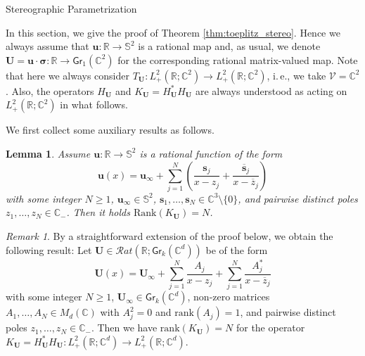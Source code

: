 \documentclass[11pt,reqno]{amsart}
\makeatletter
\newtheorem{lem}{Lemma}[section]
\theoremstyle{definition}
\theoremstyle{remark}
\theoremstyle{remark}
\newtheorem*{remark*}{Remark}
\numberwithin{equation}{section}
\newcommand{\C}{\mathbb{C}}
\newcommand{\R}{\mathbb{R}}
\newcommand{\Ss}{\mathbb{S}}
\newcommand{\VV}{\mathcal{V}}
\newcommand{\ov}{\overline}
\newcommand{\rank}{\mathrm{rank}}
\newcommand{\sv}{\mathbf{s}}
\newcommand{\uu}{\mathbf{u}}
\newcommand{\Ub}{\mathbf{U}}
\newcommand{\Gr}{\mathsf{Gr}}
\def\section{\@startsection{section}{1}%
  \z@{1.5\linespacing\@plus\linespacing}{.5\linespacing}%
  {\normalfont\bfseries\large\centering}}
\makeatother
\begin{document}
\begin{appendix}

\section{Stereographic Parametrization} \label{app:stereo}


In this section, we give the proof of Theorem \ref{thm:toeplitz_stereo}. Hence we always assume that $\uu : \R \to \Ss^2$ is a rational map and, as usual, we denote $\Ub = \uu \cdot \bm{\sigma} : \R \to \Gr_1(\C^2)$ for the corresponding rational matrix-valued map. Note that here we always consider $T_{\Ub} : L^2_+(\R; \C^2) \to L^2_+(\R; \C^2)$, i.\,e., we take $\VV = \C^2$. Also, the operators $H_\Ub$ and  $K_\Ub = H_{\Ub}^* H_\Ub$ are always understood as acting on $L^2_+(\R; \C^2)$ in what follows.


We first collect some auxiliary results as follows. 

\begin{lem} \label{lem:simple_poles}
Assume $\uu : \R \to \Ss^2$ is a rational function of the form
$$
\uu(x) = \uu_\infty + \sum_{j=1}^N \left ( \frac{\sv_j}{x-z_j} + \frac{\ov{\sv}_j}{x-\ov{z}_j} \right )
$$
with some integer $N \geq 1$, $\uu_\infty \in \Ss^2$, $\sv_1, \ldots, \sv_N \in \C^3 \setminus \{ 0 \}$, and pairwise distinct poles $z_1, \ldots, z_N \in \C_-$. Then it holds $\mathrm{Rank} (K_{\Ub}) = N$.
\end{lem}

\begin{remark*}
By a straightforward extension of the proof below, we obtain the following result: Let $\Ub \in \mathcal{R}at(\R; \Gr_k(\C^d))$ be of the form
$$
\Ub(x) = \Ub_\infty + \sum_{j=1}^N \frac{A_j}{x-z_j} + \sum_{j=1}^N \frac{A_j^*}{x-\ov{z}_j}
$$
with some integer $N \geq 1$, $\Ub_\infty \in \Gr_k(\C^d)$, non-zero matrices $A_1, \ldots, A_N \in M_d(\C)$ with $A_j^2=0$ and $\rank(A_j)=1$, and pairwise distinct poles $z_1, \ldots, z_N \in \C_-$. Then we have $\rank(K_{\Ub}) = N$ for the operator $K_{\Ub} = H_{\Ub}^* H_{\Ub} : L^2_+(\R; \C^d) \to L^2_+(\R; \C^d)$.
\end{remark*}


\end{appendix}
\end{document}
